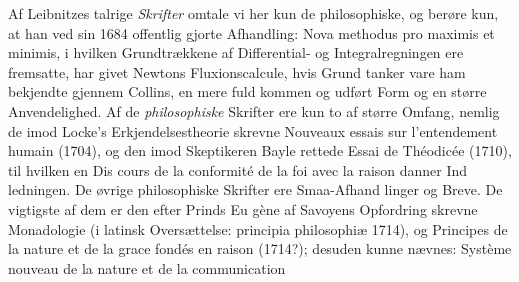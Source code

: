 \documentclass[12pt,a4paper]{book}
\begin{document}
Af Leibnitzes talrige \emph{Skrifter} omtale vi her kun de
philosophiske, og berøre kun, at han ved sin 1684 offentlig\-%
gjorte Afhandling: Nova methodus pro maximis et minimis, i
hvilken Grundtrækkene af Differential- og Integralregningen
ere fremsatte, har givet Newtons Fluxionscalcule, hvis Grund\-%
tanker vare ham bekjendte gjennem Collins, en mere fuld\-%
kommen og udført Form og en større Anvendelighed. Af de
\emph{philosophiske} Skrifter ere kun to af større Omfang, nemlig
de imod Locke's Erkjendelsestheorie skrevne Nouveaux essais
sur l'entendement humain (1704), og den imod Skeptikeren
Bayle rettede Essai de Théodicée (1710), til hvilken en Dis\-%
cours de la conformité de la foi avec la raison danner Ind\-%
ledningen. De øvrige philosophiske Skrifter ere Smaa-Afhand\-%
linger og Breve. De vigtigste af dem er den efter Prinds Eu\-%
gène af Savoyens Opfordring skrevne Monadologie (i latinsk
Oversættelse: principia philosophiæ 1714), og Principes de la
nature et de la grace fondés en raison (1714?); desuden kunne
nævnes: Système nouveau de la nature et de la communication
\end{document}

